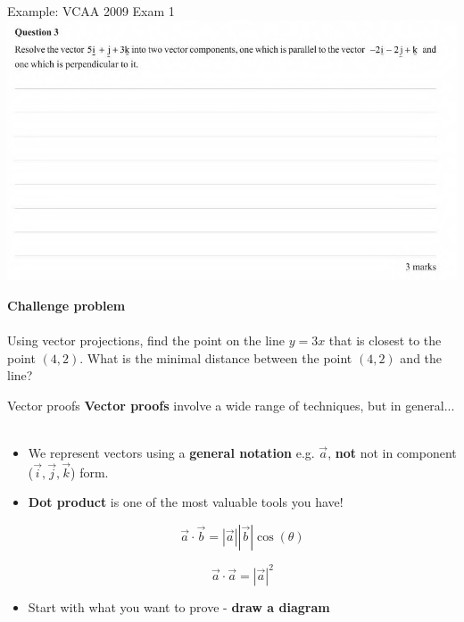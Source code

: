 \documentclass{beamer}
\begin{document}
\begin{frame}
	Example: VCAA 2009 Exam 1
	\includegraphics[width = \linewidth]{img/q2.png}
\end{frame}

\begin{frame}

	\textbf{Challenge problem}
	\\~\\
	Using vector projections, find the point on the line $y = 3x$ that is closest to the point $(4, 2)$. 
	What is the minimal distance between the point $(4, 2)$ and the line?	
	
	\vspace{5cm}

\end{frame}

\begin{frame}{Vector proofs}
	\textbf{Vector proofs} involve a wide range of techniques, but in general...\\~\\
	\begin{itemize}
		\item We represent vectors using a \textbf{general notation} e.g. $\vec{a}$, \textbf{not} not in component ($\vec{i},\vec{j},\vec{k}$) form.
		\item \textbf{Dot product} is one of the most valuable tools you have!

		$$\vec{a}\cdot\vec{b} = |\vec{a}||\vec{b}|\cos(\theta)$$
		
		$$\vec{a}\cdot\vec{a} = |\vec{a}|^2$$		
		
		\item Start with what you want to prove - \textbf{draw a diagram}
	\end{itemize}
\end{frame}
\end{document}
